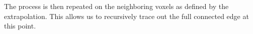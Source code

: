 \documentclass{article}
\begin{document}
The process is then repeated on the neighboring voxels as defined by the extrapolation.
This allows us to recursively trace out the full connected edge at this point.




\end{document}
